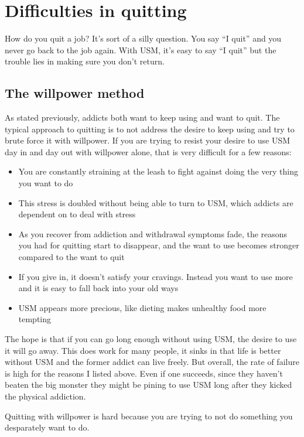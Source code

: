 \documentclass[
  openany]{book}
\providecommand{\tightlist}{%
  \setlength{\itemsep}{0pt}\setlength{\parskip}{0pt}}
\begin{document}
\chapter{Difficulties in quitting}\label{difficulties-in-quitting}

How do you quit a job? It's sort of a silly question. You say ``I quit'' and you never go back to the job again. With USM, it's easy to say ``I quit'' but the trouble lies in making sure you don't return.

\section{The willpower method}\label{the-willpower-method}

As stated previously, addicts both want to keep using and want to quit. The typical approach to quitting is to not address the desire to keep using and try to brute force it with willpower. If you are trying to resist your desire to use USM day in and day out with willpower alone, that is very difficult for a few reasons:

\begin{itemize}
\tightlist
\item
  You are constantly straining at the leash to fight against doing the very thing you want to do
\item
  This stress is doubled without being able to turn to USM, which addicts are dependent on to deal with stress
\item
  As you recover from addiction and withdrawal symptoms fade, the reasons you had for quitting start to disappear, and the want to use becomes stronger compared to the want to quit
\item
  If you give in, it doesn't satisfy your cravings. Instead you want to use more and it is easy to fall back into your old ways
\item
  USM appears more precious, like dieting makes unhealthy food more tempting
\end{itemize}

The hope is that if you can go long enough without using USM, the desire to use it will go away. This does work for many people, it sinks in that life is better without USM and the former addict can live freely. But overall, the rate of failure is high for the reasons I listed above. Even if one succeeds, since they haven't beaten the big monster they might be pining to use USM long after they kicked the physical addiction.

Quitting with willpower is hard because you are trying to not do something you desparately want to do.
\end{document}
